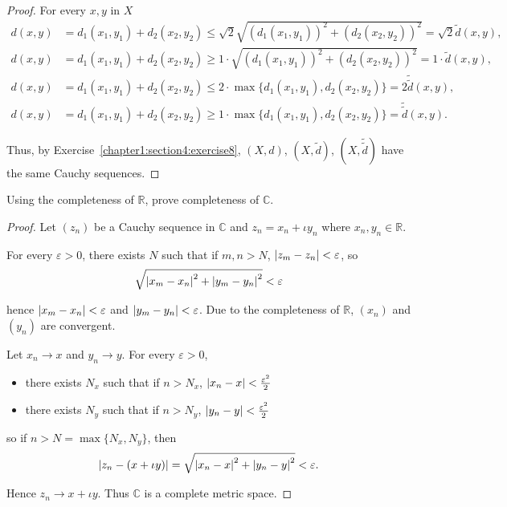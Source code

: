 \begin{proof}
    For every $x, y$ in $X$
    \begin{align*}
        d(x, y) & = d_{1}(x_{1}, y_{1}) + d_{2}(x_{2}, y_{2}) \leq \sqrt{2}\sqrt{{(d_{1}(x_{1}, y_{1}))}^{2} + {(d_{2}(x_{2}, y_{2}))}^{2}} = \sqrt{2}\widetilde{d}(x, y), \\
        d(x, y) & = d_{1}(x_{1}, y_{1}) + d_{2}(x_{2}, y_{2}) \geq 1\cdot\sqrt{{(d_{1}(x_{1}, y_{1}))}^{2} + {(d_{2}(x_{2}, y_{2}))}^{2}} = 1\cdot \widetilde{d}(x, y),    \\
        d(x, y) & = d_{1}(x_{1}, y_{1}) + d_{2}(x_{2}, y_{2}) \leq 2\cdot\max\{ d_{1}(x_{1}, y_{1}), d_{2}(x_{2}, y_{2}) \} = 2\tilde{\tilde{d}}(x, y),                    \\
        d(x, y) & = d_{1}(x_{1}, y_{1}) + d_{2}(x_{2}, y_{2}) \geq 1\cdot \max\{ d_{1}(x_{1}, y_{1}), d_{2}(x_{2}, y_{2}) \} = \tilde{\tilde{d}}(x, y).
    \end{align*}

    Thus, by Exercise~\ref{chapter1:section4:exercise8}, $(X, d)$, $(X, \tilde{d})$, $(X, \tilde{\tilde{d}})$ have the same Cauchy sequences.
\end{proof}

\begin{exercise}\label{chapter1:section4:exercise10}
    Using the completeness of $\mathbb{R}$, prove completeness of $\mathbb{C}$.
\end{exercise}

\begin{proof}
    Let $(z_{n})$ be a Cauchy sequence in $\mathbb{C}$ and $z_{n} = x_{n} + \iota y_{n}$ where $x_{n}, y_{n}\in\mathbb{R}$.

    For every $\varepsilon > 0$, there exists $N$ such that if $m, n > N$, $\left\vert{z_{m} - z_{n}}\right\vert < \varepsilon$, so
    \[
        \sqrt{\left\vert{x_{m} - x_{n}}\right\vert^{2} + \left\vert{y_{m} - y_{n}}\right\vert^{2}} < \varepsilon
    \]

    hence $\left\vert{x_{m} - x_{n}}\right\vert < \varepsilon$ and $\left\vert{y_{m} - y_{n}}\right\vert < \varepsilon$. Due to the completeness of $\mathbb{R}$, ${(x_{n})}$ and ${(y_{n})}$ are convergent.

    Let $x_{n} \to x$ and $y_{n} \to y$. For every $\varepsilon > 0$,
    \begin{itemize}
        \item there exists $N_{x}$ such that if $n > N_{x}$, $\left\vert{x_{n} - x}\right\vert < \frac{\varepsilon^{2}}{2}$
        \item there exists $N_{y}$ such that if $n > N_{y}$, $\left\vert{y_{n} - y}\right\vert < \frac{\varepsilon^{2}}{2}$
    \end{itemize}

    so if $n > N = \max\{ N_{x}, N_{y} \}$, then
    \[
        \left\vert{z_{n} - (x + \iota y)}\right\vert = \sqrt{\left\vert{x_{n} - x}\right\vert^{2} + \left\vert{y_{n} - y}\right\vert^{2}} < \varepsilon.
    \]

    Hence $z_{n} \to x + \iota y$. Thus $\mathbb{C}$ is a complete metric space.
\end{proof}

